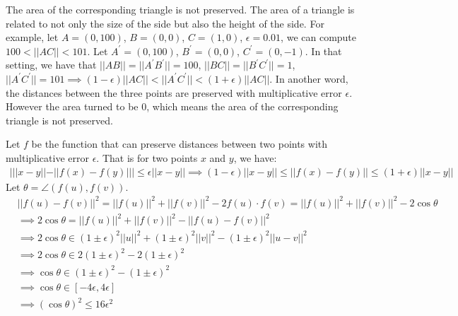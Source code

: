 
The area  of the corresponding triangle is not preserved.
The area of a triangle is related to not only the size of the side but also the height of the side.
For example, let $A=(0,100)$, $B=(0,0)$, $C=(1,0)$, $\epsilon=0.01$, we can compute $100<||AC||<101$.
Let $A^\prime=(0,100)$, $B^\prime=(0,0)$, $C^\prime=(0,-1)$.
In that setting, we have that $||AB||=||A^\prime B^\prime||=100$, $||BC||=||B^\prime C^\prime||=1$, $||A^\prime C^\prime||=101\implies (1-\epsilon)||AC||<||A^\prime C^\prime||<(1+\epsilon)||AC||$.
In another word, the distances between the three points are preserved with multiplicative error $\epsilon$.
However the area turned to be $0$, which means the area  of the corresponding triangle is not preserved.


Let $f$ be the function that can preserve distances between two points with multiplicative error $\epsilon$.
That is for two points $x$ and $y$, we have:
\begin{align}
    \nonumber |||x-y||-||f(x)-f(y)||| \le \epsilon ||x-y|| \implies
    (1-\epsilon)||x-y||\le||f(x)-f(y)||\le(1+\epsilon)||x-y||
\end{align}
Let $\theta=\angle(f(u),f(v))$.
\begin{align}
    \nonumber &||f(u)-f(v)||^2=||f(u)||^2+||f(v)||^2-2f(u)\cdot f(v)=||f(u)||^2+||f(v)||^2-2\cos\theta\\
    \nonumber &\implies 2 \cos\theta =||f(u)||^2+||f(v)||^2-||f(u)-f(v)||^2\\
    \nonumber &\implies 2 \cos\theta\in (1\pm\epsilon)^2||u||^2+(1\pm\epsilon)^2||v||^2-(1\pm \epsilon)^2||u-v||^2\\
    \nonumber &\implies 2 \cos\theta\in  2(1\pm\epsilon)^2-2(1\pm \epsilon)^2\\
    \nonumber &\implies \cos\theta\in (1\pm\epsilon)^2-(1\pm \epsilon)^2\\
    \nonumber &\implies \cos\theta \in [-4\epsilon,4\epsilon]\\
    \nonumber &\implies (\cos\theta)^2\le16\epsilon^2
\end{align}

